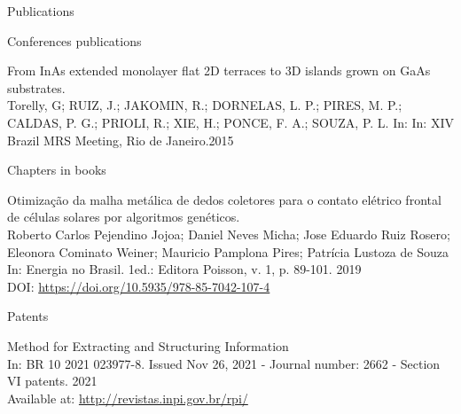 \documentclass{resume} %
\begin{document}
\begin{rSection}{Publications}
\begin{rSubsection}{Conferences publications}{}{}{}
            \item From InAs extended monolayer flat 2D terraces to 3D islands grown on GaAs substrates. \\ {\normalfont Torelly, G; RUIZ, J.; JAKOMIN, R.; DORNELAS, L. P.; PIRES, M. P.; CALDAS, P. G.; PRIOLI, R.; XIE, H.; PONCE, F. A.; SOUZA, P. L.} In:  {\normalfont In: XIV Brazil MRS Meeting, Rio de Janeiro.2015} %
        \end{rSubsection}

        \begin{rSubsection}{Chapters in books}{}{}{}
            \item Otimização da malha metálica de dedos coletores para o contato elétrico frontal de células solares por algoritmos genéticos. \\ {\normalfont Roberto Carlos Pejendino Jojoa; Daniel Neves Micha; Jose Eduardo Ruiz Rosero; Eleonora Cominato Weiner; Mauricio Pamplona Pires; Patrícia Lustoza de Souza} In:  {\normalfont Energia no Brasil. 1ed.: Editora Poisson, v. 1, p. 89-101. 2019} \\ DOI: {\normalfont  \url{https://doi.org/10.5935/978-85-7042-107-4        }}
        \end{rSubsection}

        \begin{rSubsection}{Patents}{}{}{}
            \item Method for Extracting and Structuring Information \\ {\normalfont } In:  {\normalfont BR 10 2021 023977-8. Issued Nov 26, 2021 - Journal number: 2662 - Section VI patents. 2021} \\ Available at: {\normalfont  \url{http://revistas.inpi.gov.br/rpi/}}
        \end{rSubsection}
        
    \end{rSection}
    
\end{document}
